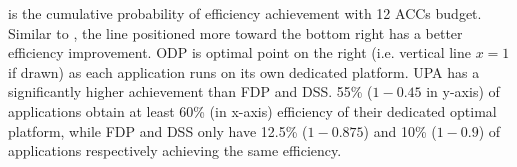  is the cumulative probability of efficiency achievement with 12 ACCs budget. Similar to , the line positioned more toward the bottom right has a better efficiency improvement.
ODP is optimal point on the right (i.e. vertical line $x=1$ if drawn) as each application runs on its own dedicated platform.
UPA has a significantly higher achievement than FDP and DSS.
55\% ($1-0.45$ in y-axis) of applications obtain at least 60\% (in x-axis) efficiency of their dedicated optimal platform, while FDP and DSS only have 12.5\% ($1-0.875$) and 10\% ($1-0.9$) of applications respectively achieving the same efficiency.


